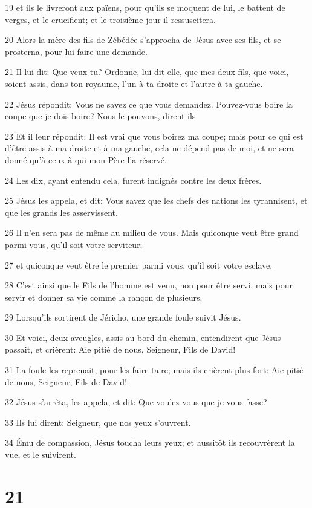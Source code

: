 \par 19 et ils le livreront aux païens, pour qu'ils se moquent de lui, le battent de verges, et le crucifient; et le troisième jour il ressuscitera.
\par 20 Alors la mère des fils de Zébédée s'approcha de Jésus avec ses fils, et se prosterna, pour lui faire une demande.
\par 21 Il lui dit: Que veux-tu? Ordonne, lui dit-elle, que mes deux fils, que voici, soient assis, dans ton royaume, l'un à ta droite et l'autre à ta gauche.
\par 22 Jésus répondit: Vous ne savez ce que vous demandez. Pouvez-vous boire la coupe que je dois boire? Nous le pouvons, dirent-ils.
\par 23 Et il leur répondit: Il est vrai que vous boirez ma coupe; mais pour ce qui est d'être assis à ma droite et à ma gauche, cela ne dépend pas de moi, et ne sera donné qu'à ceux à qui mon Père l'a réservé.
\par 24 Les dix, ayant entendu cela, furent indignés contre les deux frères.
\par 25 Jésus les appela, et dit: Vous savez que les chefs des nations les tyrannisent, et que les grands les asservissent.
\par 26 Il n'en sera pas de même au milieu de vous. Mais quiconque veut être grand parmi vous, qu'il soit votre serviteur;
\par 27 et quiconque veut être le premier parmi vous, qu'il soit votre esclave.
\par 28 C'est ainsi que le Fils de l'homme est venu, non pour être servi, mais pour servir et donner sa vie comme la rançon de plusieurs.
\par 29 Lorsqu'ils sortirent de Jéricho, une grande foule suivit Jésus.
\par 30 Et voici, deux aveugles, assis au bord du chemin, entendirent que Jésus passait, et crièrent: Aie pitié de nous, Seigneur, Fils de David!
\par 31 La foule les reprenait, pour les faire taire; mais ils crièrent plus fort: Aie pitié de nous, Seigneur, Fils de David!
\par 32 Jésus s'arrêta, les appela, et dit: Que voulez-vous que je vous fasse?
\par 33 Ils lui dirent: Seigneur, que nos yeux s'ouvrent.
\par 34 Ému de compassion, Jésus toucha leurs yeux; et aussitôt ils recouvrèrent la vue, et le suivirent.

\chapter{21}

